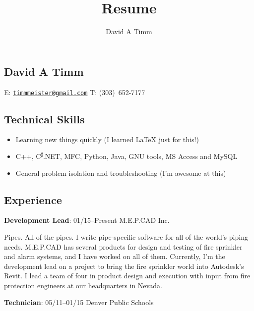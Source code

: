 \documentclass[letterpaper,12pt]{article}
\author{David A Timm}
\title{Resume}
\begin{document}
\begin{center}
\section{David A Timm}

E: \href{mailto:timmmeister@gmail.com?subject=You%27re%20hired!}
{\nolinkurl{timmmeister@gmail.com}}
T: \mbox{(303) 652-7177}
\end{center}

\begin{center}
\subsection{Technical Skills}
\end{center}

\begin{itemize}
\item Learning new things quickly (I learned \LaTeX{} just for this!)
\item C++, C\textsuperscript{{$\sharp$}}.NET, MFC, Python, Java, GNU tools, MS Access and MySQL
\item General problem isolation and troubleshooting (I'm awesome at this)
\end{itemize}

\begin{center}
\subsection{Experience}
\end{center}

\begin{flushleft}
\textbf{Development Lead}: 01/15--Present M.E.P.CAD Inc.
\end{flushleft}

Pipes. All of the pipes. I write pipe-specific software for all of the world's
piping needs. M.E.P.CAD has several products for design and testing of fire
sprinkler and alarm systems, and I have worked on all of them. Currently, I'm
the development lead on a project to bring the fire sprinkler world into
Autodesk's Revit. I lead a team of four in product design and execution with
input from fire protection engineers at our headquarters in Nevada.

\begin{flushleft}
\textbf{Technician}: 05/11--01/15 Denver Public Schools
\end{flushleft}
\end{document}
